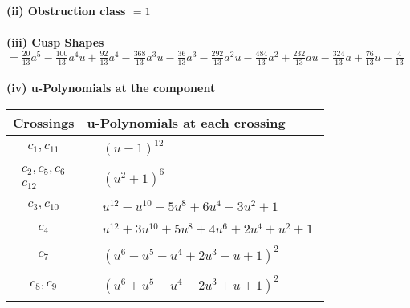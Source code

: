 \documentclass[1p]{elsarticle_modified}
\theoremstyle{definition}
\begin{document}
\flushleft \textbf{(ii) Obstruction class $= 1$}\\~\\
\flushleft \textbf{(iii) Cusp Shapes $= \frac{20}{13} a^5-\frac{100}{13} a^4 u+\frac{92}{13} a^4-\frac{368}{13} a^3 u-\frac{36}{13} a^3-\frac{292}{13} a^2 u-\frac{484}{13} a^2+\frac{232}{13} a u-\frac{324}{13} a+\frac{76}{13} u-\frac{4}{13}$}\\~\\
\newpage\renewcommand{\arraystretch}{1}
\flushleft \textbf{(iv) u-Polynomials at the component}\newline \\
\begin{tabular}{m{50pt}|m{274pt}}
Crossings & \hspace{64pt}u-Polynomials at each crossing \\
\hline $$\begin{aligned}c_{1},c_{11}\end{aligned}$$&$\begin{aligned}
&(u-1)^{12}
\end{aligned}$\\
\hline $$\begin{aligned}c_{2},c_{5},c_{6}\\c_{12}\end{aligned}$$&$\begin{aligned}
&(u^2+1)^6
\end{aligned}$\\
\hline $$\begin{aligned}c_{3},c_{10}\end{aligned}$$&$\begin{aligned}
&u^{12}- u^{10}+5 u^8+6 u^4-3 u^2+1
\end{aligned}$\\
\hline $$\begin{aligned}c_{4}\end{aligned}$$&$\begin{aligned}
&u^{12}+3 u^{10}+5 u^8+4 u^6+2 u^4+u^2+1
\end{aligned}$\\
\hline $$\begin{aligned}c_{7}\end{aligned}$$&$\begin{aligned}
&(u^6- u^5- u^4+2 u^3- u+1)^2
\end{aligned}$\\
\hline $$\begin{aligned}c_{8},c_{9}\end{aligned}$$&$\begin{aligned}
&(u^6+u^5- u^4-2 u^3+u+1)^2
\end{aligned}$\\
\hline
\end{tabular}\\~\\
\end{document}
